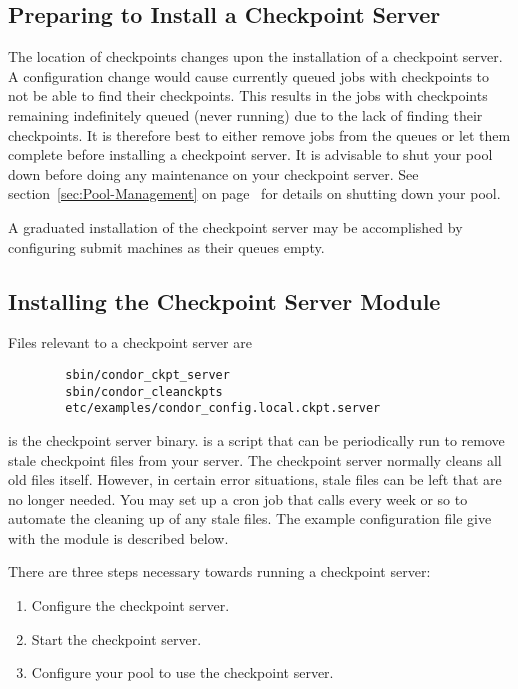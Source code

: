 \subsection{\label{Prepare-Ckpt-Server} Preparing to Install
a Checkpoint Server} 

The location of checkpoints changes upon the installation
of a checkpoint server.
A configuration change would cause 
currently queued jobs with checkpoints
to not be able to find their checkpoints.
This results in the jobs with checkpoints
remaining indefinitely queued (never running)
due to the lack of finding their checkpoints.
It is therefore best to 
either remove jobs from the queues or let them complete
before installing a checkpoint server.
It is advisable to shut your pool down before doing any
maintenance on your checkpoint server.  
See section~\ref{sec:Pool-Management} on
page~\pageref{sec:Pool-Management} for details on shutting
down your pool. 

A graduated installation of the checkpoint server may be
accomplished by 
configuring submit machines as their queues empty.

\subsection{\label{Install-Ckpt-Server-Module}
Installing the Checkpoint Server Module} 

Files relevant to a checkpoint server are
\begin{verbatim}
        sbin/condor_ckpt_server
        sbin/condor_cleanckpts
        etc/examples/condor_config.local.ckpt.server
\end{verbatim}
 is the checkpoint server binary.
 is a script that can be periodically run to
remove stale checkpoint files from your server.  
The checkpoint server normally cleans all old files itself.  
However, in certain error situations, stale files can be left that are
no longer needed.
You may set up a cron job that calls
 every week or so to automate the cleaning up
of any
stale files.
The example configuration file give with the module
is described below.

There are three steps necessary towards running a checkpoint server:
\begin{enumerate}
\item Configure the checkpoint server.
\item Start the checkpoint server.
\item Configure your pool to use the checkpoint server.
\end{enumerate}


